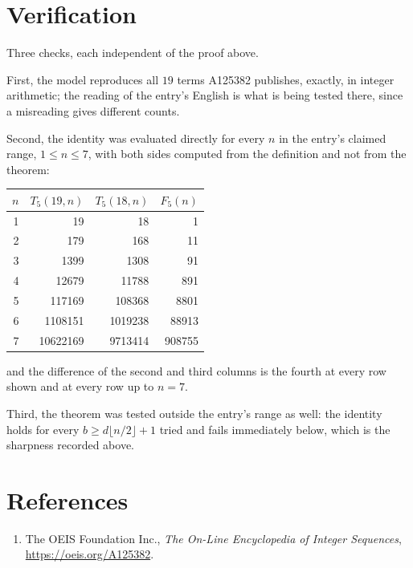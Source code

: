 \documentclass[11pt,a4paper]{article}
\theoremstyle{plain}
\theoremstyle{definition}
\begin{document}
\section{Verification}

Three checks, each independent of the proof above.

First, the model reproduces all $19$ terms A125382 publishes, exactly, in integer
arithmetic; the reading of the entry's English is what is being tested there, since a
misreading gives different counts.

Second, the identity was evaluated directly for every $n$ in the entry's claimed range,
$1\le n\le7$, with both sides computed from the definition and not from the theorem:

\begin{center}
\begin{tabular}{rrrr}
$n$ & $T_{5}(19,n)$ & $T_{5}(18,n)$ & $F_{5}(n)$ \\ \hline
1 & 19 & 18 & 1 \\
2 & 179 & 168 & 11 \\
3 & 1399 & 1308 & 91 \\
4 & 12679 & 11788 & 891 \\
5 & 117169 & 108368 & 8801 \\
6 & 1108151 & 1019238 & 88913 \\
7 & 10622169 & 9713414 & 908755 \\
\end{tabular}
\end{center}

\noindent and the difference of the second and third columns is the fourth at every row shown
and at every row up to $n=7$.

Third, the theorem was tested outside the entry's range as well: the identity holds for every
$b\ge d\lfloor n/2\rfloor+1$ tried and fails immediately below, which is the sharpness recorded
above.

\section*{References}
\begin{enumerate}
\item The OEIS Foundation Inc., \emph{The On-Line Encyclopedia of Integer Sequences},
\url{https://oeis.org/A125382}.
\end{enumerate}
\end{document}
